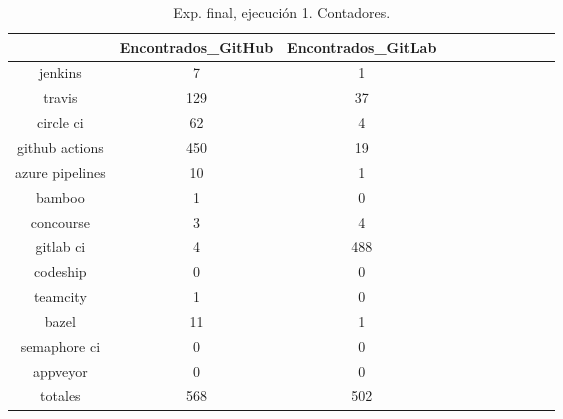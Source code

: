 \begin{table}[h]
  \centering
  \caption{Exp. final, ejecución 1. Contadores.}
  \label{tab:tabla_f_1_1}

\begin{footnotesize}
\renewcommand{\arraystretch}{1.5} %
\begin{tabular}{ccccccccccc}
  \hline
  {} &  Encontrados\_GitHub &  Encontrados\_GitLab \\
  \hline
  jenkins         &                   7 &                   1 \\
  travis          &                 129 &                  37 \\
  circle ci       &                  62 &                   4 \\
  github actions  &                 450 &                  19 \\
  azure pipelines &                  10 &                   1 \\
  bamboo          &                   1 &                   0 \\
  concourse       &                   3 &                   4 \\
  gitlab ci       &                   4 &                 488 \\
  codeship        &                   0 &                   0 \\
  teamcity        &                   1 &                   0 \\
  bazel           &                  11 &                   1 \\
  semaphore ci    &                   0 &                   0 \\
  appveyor        &                   0 &                   0 \\
  totales         &                 568 &                 502 \\
 \end{tabular}
\end{footnotesize}

\end{table}


